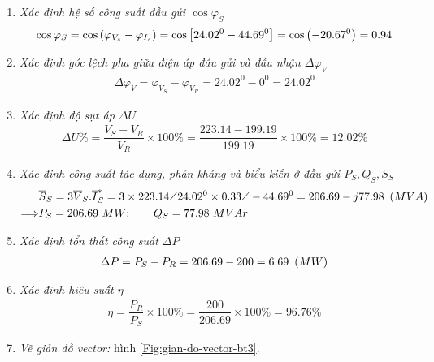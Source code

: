 \begin{enumerate}
\begin{enumerate}[\it a.]
					\item \emph{Xác định hệ số công suất đầu gửi $\cos \varphi_S$}
						\begin{align*}
							\cos \varphi_S  = \cos \left({\varphi_{V_s} - \varphi_{I_{s}}}\right)= \cos \left[{24.02^0 - 44.69^0} \right] = \cos \left({-20.67^0}\right) = 0.94
						\end{align*}
				
				\item \emph{Xác định góc lệch pha giữa điện áp đầu gửi và đầu nhận $\Delta \varphi_V$}
					\begin{align*}
						\Delta \varphi_V = \varphi_{V_S} - \varphi_{V_R} = 24.02^0 - 0^0 = 24.02^0
					\end{align*}
					
				\item \emph{Xác định độ sụt áp $\Delta U$}
					\begin{align*}
						\Delta U \%= \dfrac{V_S - V_R}{V_R} \times 100 \% = \dfrac{223.14 - 199.19}{199.19} \times 100 \% = 12.02\%
					\end{align*}
					
				\item \emph{Xác định công suất tác dụng, phản kháng và biểu kiến ở đầu gửi $P_S, Q_S, S_S$}
					\begin{align*}
						& \overline{S}_S  = 3 \overline{V}_S.\overline{I}_S^{\ast} = 3 \times 223.14 \angle 24.02^0 \times 0.33 \angle -44.69^0 = 206.69 - j77.98 ~\left({MVA}\right)\\
						\Longrightarrow & P_S  = 206.69 ~MW; \qquad Q_S = 77.98 ~MVAr
					\end{align*}
				\item \emph{Xác định tổn thất công suất $\Delta P$}
					\begin{align*}
						\Delta P = P_S - P_R = 206.69 - 200 = 6.69 ~\left({MW}\right)
					\end{align*}
				
				\item \emph{Xác định hiệu suất $\eta$}
						\begin{align*}
							\eta = \dfrac{P_R}{P_S} \times 100 \% = \dfrac{200}{206.69} \times 100\% = 96.76\%
						\end{align*}
					
				\item \emph{Vẽ giản đồ vector:} hình \ref{Fig:gian-do-vector-bt3}.
					\begin{figure}[!h]
						\begin{center}
\end{center}
\end{figure}
\end{enumerate}
\end{enumerate}
